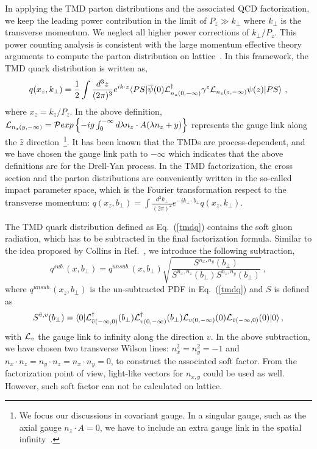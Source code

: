 \documentclass[aps,prd,preprint,tightenlines,superscriptaddress,nofootinbib]{revtex4}
\begin{document}
In applying the TMD parton distributions and the associated QCD factorization, we keep the
leading power contribution in the limit of $P_z\gg k_\perp$ where $k_\perp$
is the transverse momentum. We neglect all higher power corrections of $k_\perp/P_z$.
This power counting analysis is consistent with the large momentum effective
theory arguments to compute the parton distribution on lattice~\cite{Ji:2013dva}.
In this framework, the TMD quark distribution is  written as, 
\begin{equation}
q(x_z,k_\perp)=\frac{1}{2}\int\frac{d^3z}{(2\pi)^3}e^{ik\cdot z}\langle PS|\overline{\psi}(0)
{\cal L}_{n_z(0,-\infty)}^\dagger\gamma^z{\cal L}_{n_z(z,-\infty)}\psi(z)|PS\rangle \ , \label{tmdq}
\end{equation}
where $x_z=k_z/P_z$. In the above definition, ${\cal L}_{n_z(y,-\infty)}={\cal P}exp\left\{-ig\int_0^{-\infty}
d\lambda n_z\cdot A(\lambda n_z+y)\right\}$ represents
the gauge link along the $\hat z$ direction~\footnote{We focus our discussions in
covariant gauge. In a singular gauge, such as the axial gauge $n_z\cdot A=0$, we have to include 
an extra gauge link in the spatial infinity~\cite{Ji:2002aa}.}. 
It has been known that the TMDs are process-dependent, and we have chosen
the gauge link path to $-\infty$ which indicates that the above definitions are for
the Drell-Yan process. 
In the TMD factorization, the cross section
and the parton distributions are conveniently written in the
so-called impact parameter space, which is the Fourier
transformation respect to the transverse momentum:
$q(x_z,b_\perp)=\int \frac{d^2k_\perp}{(2\pi)^2} e^{-ik_\perp\cdot b_\perp} q(x_z,k_\perp)$.

The TMD quark distribution defined as Eq.~(\ref{tmdq}) contains
the soft gluon radiation, which has to be subtracted in the final factorization
formula. Similar to the idea proposed by Collins in Ref.~\cite{Collins},
we introduce the following subtraction,
\begin{equation}
q^{sub.}(x,b_\perp)=q^{unsub.}(x,b_\perp)\sqrt{\frac{S^{n_x,n_y}(b_\perp)}{S^{n_x,n_z}(b_\perp)S^{n_z,n_y}(b_\perp)}} \ , \label{tmd}
\end{equation}
where $q^{unsub.}(x_z,b_\perp)$ is the un-subtracted PDF
in Eq.~(\ref{tmdq}) and $S$ is defined as
\begin{equation}
S^{\bar v, v}(b_\perp)={\langle 0|{\cal L}_{\bar v(-\infty,0)}^\dagger(b_\perp)
{\cal L}_{v(0,-\infty)}^\dagger(b_\perp) {\cal
L}_{ v(0,-\infty)}(0) {\cal L}_{\bar v(-\infty,0)}(0) |0\rangle   }\, , \label{softg}
\end{equation}
with ${\cal L}_v$ the gauge link to infinity along the direction $v$. 
In the above subtraction, we have chosen two transverse
Wilson lines: $n_x^2=n_y^2=-1$ and $n_x\cdot n_z=n_y\cdot n_z=n_x\cdot n_y=0$, 
to construct the associated soft factor. From the factorization point of view, light-like vectors for $n_{x,y}$ could be
used as well. However, such soft factor can not be calculated on lattice.
\end{document}
